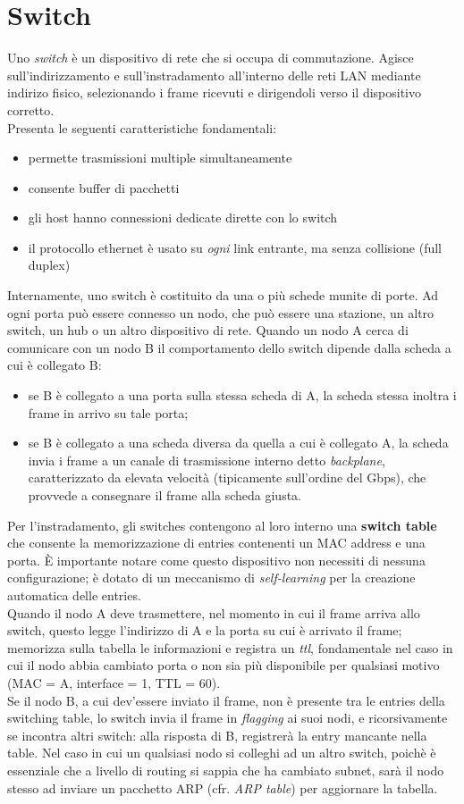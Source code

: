 \section{Switch}
Uno \textit{switch} è un dispositivo di rete che si occupa di commutazione. Agisce sull'indirizzamento e sull'instradamento all'interno delle reti LAN mediante indirizo fisico, selezionando i frame ricevuti e dirigendoli verso il dispositivo corretto.\\
Presenta le seguenti caratteristiche fondamentali:
\begin{itemize}
	\item permette trasmissioni multiple simultaneamente
	\item consente buffer di pacchetti
	\item gli host hanno connessioni dedicate dirette con lo switch
	\item il protocollo ethernet è usato su \textit{ogni} link entrante, ma senza collisione (full duplex)
\end{itemize}
Internamente, uno switch è costituito da una o più schede munite di porte. Ad ogni porta può essere connesso un nodo, che può essere una stazione, un altro switch, un hub o un altro dispositivo di rete.
Quando un nodo A cerca di comunicare con un nodo B il comportamento dello switch dipende dalla scheda a cui è collegato B:
\begin{itemize}
	\item se B è collegato a una porta sulla stessa scheda di A, la scheda stessa inoltra i frame in arrivo su tale porta;
	\item se B è collegato a una scheda diversa da quella a cui è collegato A, la scheda invia i frame a un canale di trasmissione interno detto \textit{backplane}, caratterizzato da elevata velocità (tipicamente sull'ordine del Gbps), che provvede a consegnare il frame alla scheda giusta.
\end{itemize}
Per l'instradamento, gli switches contengono al loro interno una \textbf{switch table} che consente la memorizzazione di entries contenenti un MAC address e una porta. È importante notare come questo dispositivo non necessiti di nessuna configurazione; è dotato di un meccanismo di \textit{self-learning} per la creazione automatica delle entries.\\
Quando il nodo A deve trasmettere, nel momento in cui il frame arriva allo switch, questo legge l'indirizzo di A e la porta su cui è arrivato il frame; memorizza sulla tabella le informazioni e registra un \textit{ttl}, fondamentale nel caso in cui il nodo abbia cambiato porta o non sia più disponibile per qualsiasi motivo (MAC = A, interface = 1, TTL = 60).\\
Se il nodo B, a cui dev'essere inviato il frame, non è presente tra le entries della switching table, lo switch invia il frame in \textit{flagging} ai suoi nodi, e ricorsivamente se incontra altri switch: alla risposta di B, registrerà la entry mancante nella table. Nel caso in cui un qualsiasi nodo si colleghi ad un altro switch, poichè è essenziale che a livello di routing si sappia che ha cambiato subnet, sarà il nodo stesso ad inviare un pacchetto ARP (cfr. \textit{ARP table}) per aggiornare la tabella.\\
